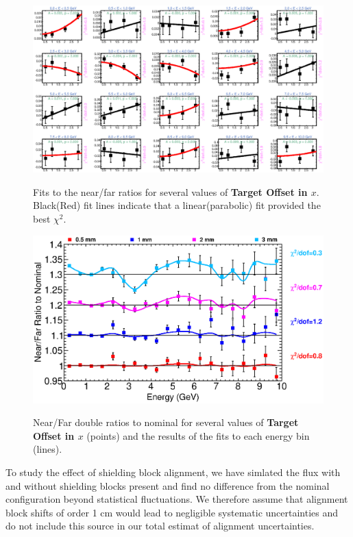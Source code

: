 \begin{figure}[ht]
\label{fig:TargetXOffset_nof_fits}
  \begin{center}
    {\includegraphics[width=5.0in]{figures/TargetXOffset_nof_fits.eps}}
  \end{center}
\caption{ Fits to the near/far ratios for several values of {\bf Target Offset in $x$}. Black(Red) fit lines indicate that a linear(parabolic) fit provided the best $\chi^2$. }
\end{figure}

\begin{figure}[ht]
\label{fig:TargetXOffset_nof_error}
  \begin{center}
    {\includegraphics[width=6.0in]{figures/TargetXOffset_nof_summary.eps}}
  \end{center}
\caption{ Near/Far double ratios to nominal for several values of {\bf Target Offset in $x$} (points) and the results of the fits to each energy bin (lines).}
\end{figure}


To study the effect of shielding block alignment, we have simlated the flux with and without shielding blocks present and find no difference from the nominal configuration beyond statistical fluctuations.  We therefore assume that alignment block shifts of order 1 cm would lead to negligible systematic uncertainties and do not include this source in our total estimat of alignment uncertainties.

